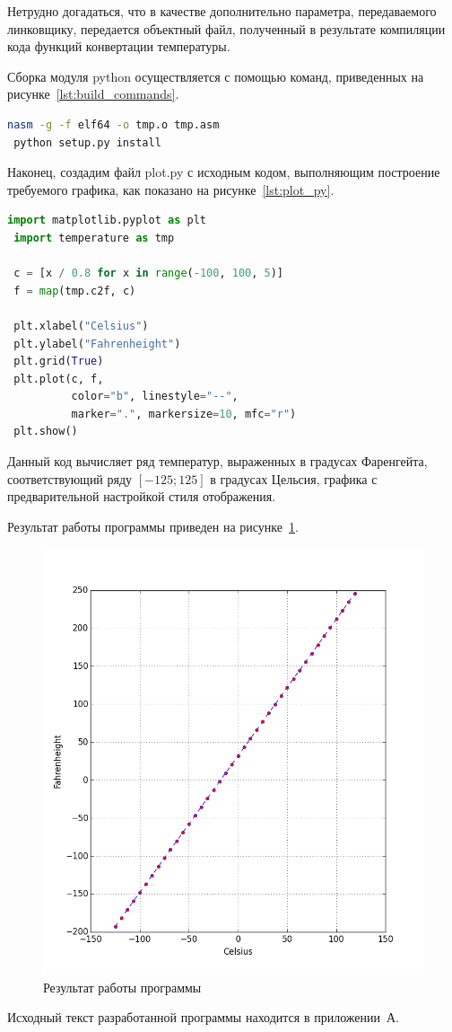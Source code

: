 Нетрудно догадаться, что в качестве дополнительно параметра, 
передаваемого линковщику, передается объектный файл, полученный
в результате компиляции кода функций конвертации температуры.

Сборка модуля python осуществляется с помощью команд,
приведенных на рисунке~\ref{lst:build_commands}.

\begin{lstlisting}[caption=Команды создания модуля Python,
label=lst:build_commands,language={bash},basicstyle=\scriptsize\ttfamily]
 nasm -g -f elf64 -o tmp.o tmp.asm
 python setup.py install
\end{lstlisting}

Наконец, создадим файл plot.py с исходным кодом, выполняющим построение требуемого 
графика, как показано на рисунке~\ref{lst:plot_py}.

\begin{lstlisting}[caption=Исходный код построения графика завимости температуры,
label=lst:plot_py,language={Python},basicstyle=\scriptsize\ttfamily]
 import matplotlib.pyplot as plt
 import temperature as tmp

 c = [x / 0.8 for x in range(-100, 100, 5)]
 f = map(tmp.c2f, c)

 plt.xlabel("Celsius")
 plt.ylabel("Fahrenheight")
 plt.grid(True)
 plt.plot(c, f,
          color="b", linestyle="--",
          marker=".", markersize=10, mfc="r")
 plt.show()
\end{lstlisting}

Данный код вычисляет ряд температур, выраженных в градусах Фаренгейта, соответствующий
ряду $ [-125; 125] $ в градусах Цельсия, графика с предварительной настройкой 
стиля отображения.

Результат работы программы приведен на рисунке~\ref{pic:result}.

\begin{figure}[h!]
  \centering
  \includegraphics[width=0.8\linewidth]{pic/result}
  \caption{Результат работы программы}
  \label{pic:result}
\end{figure}

Исходный текст разработанной программы находится в приложении~А.
